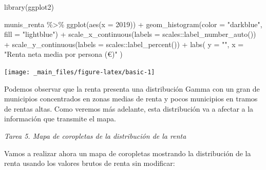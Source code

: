 \documentclass[
]{report}
\newenvironment{Shaded}{\begin{snugshade}}{\end{snugshade}}
\newcommand{\AttributeTok}[1]{\textcolor[rgb]{0.77,0.63,0.00}{#1}}
\newcommand{\FunctionTok}[1]{\textcolor[rgb]{0.00,0.00,0.00}{#1}}
\newcommand{\NormalTok}[1]{#1}
\newcommand{\SpecialCharTok}[1]{\textcolor[rgb]{0.00,0.00,0.00}{#1}}
\newcommand{\StringTok}[1]{\textcolor[rgb]{0.31,0.60,0.02}{#1}}
\theoremstyle{definition}
\theoremstyle{definition}
\theoremstyle{definition}
\theoremstyle{definition}
\theoremstyle{remark}
\begin{document}
\begin{Shaded}
\begin{Highlighting}[]

\FunctionTok{library}\NormalTok{(ggplot2)}

\NormalTok{munis\_renta }\SpecialCharTok{\%\textgreater{}\%}
  \FunctionTok{ggplot}\NormalTok{(}\FunctionTok{aes}\NormalTok{(}\AttributeTok{x =} \StringTok{\textasciigrave{}}\AttributeTok{2019}\StringTok{\textasciigrave{}}\NormalTok{)) }\SpecialCharTok{+}
  \FunctionTok{geom\_histogram}\NormalTok{(}\AttributeTok{color =} \StringTok{"darkblue"}\NormalTok{, }\AttributeTok{fill =} \StringTok{"lightblue"}\NormalTok{) }\SpecialCharTok{+}
  \FunctionTok{scale\_x\_continuous}\NormalTok{(}\AttributeTok{labels =}\NormalTok{ scales}\SpecialCharTok{::}\FunctionTok{label\_number\_auto}\NormalTok{()) }\SpecialCharTok{+}
  \FunctionTok{scale\_y\_continuous}\NormalTok{(}\AttributeTok{labels =}\NormalTok{ scales}\SpecialCharTok{::}\FunctionTok{label\_percent}\NormalTok{()) }\SpecialCharTok{+}
  \FunctionTok{labs}\NormalTok{(}
    \AttributeTok{y =} \StringTok{""}\NormalTok{,}
    \AttributeTok{x =} \StringTok{"Renta neta media por persona (€)"}
\NormalTok{  )}
\end{Highlighting}
\end{Shaded}

\begin{center}\texttt{[image: \_main\_files/figure-latex/basic-1]} \end{center}

Podemos observar que la renta presenta una distribución Gamma con un gran de
municipios concentrados en zonas medias de renta y pocos municipios en tramos de
rentas altas. Como veremos más adelante, esta distribución va a afectar a la
información que transmite el mapa.

\emph{Tarea 5. Mapa de coropletas de la distribución de la renta}

Vamos a realizar ahora un mapa de coropletas mostrando la distribución de la
renta usando los valores brutos de renta sin modificar:
\end{document}
